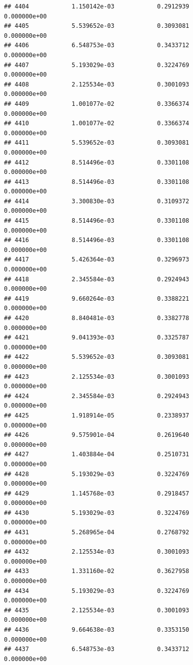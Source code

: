 \documentclass[
]{article}
\begin{document}
\begin{verbatim}
## 4404            1.150142e-03            0.2912939            0.000000e+00
## 4405            5.539652e-03            0.3093081            0.000000e+00
## 4406            6.548753e-03            0.3433712            0.000000e+00
## 4407            5.193029e-03            0.3224769            0.000000e+00
## 4408            2.125534e-03            0.3001093            0.000000e+00
## 4409            1.001077e-02            0.3366374            0.000000e+00
## 4410            1.001077e-02            0.3366374            0.000000e+00
## 4411            5.539652e-03            0.3093081            0.000000e+00
## 4412            8.514496e-03            0.3301108            0.000000e+00
## 4413            8.514496e-03            0.3301108            0.000000e+00
## 4414            3.300830e-03            0.3109372            0.000000e+00
## 4415            8.514496e-03            0.3301108            0.000000e+00
## 4416            8.514496e-03            0.3301108            0.000000e+00
## 4417            5.426364e-03            0.3296973            0.000000e+00
## 4418            2.345584e-03            0.2924943            0.000000e+00
## 4419            9.660264e-03            0.3388221            0.000000e+00
## 4420            8.840481e-03            0.3382778            0.000000e+00
## 4421            9.041393e-03            0.3325787            0.000000e+00
## 4422            5.539652e-03            0.3093081            0.000000e+00
## 4423            2.125534e-03            0.3001093            0.000000e+00
## 4424            2.345584e-03            0.2924943            0.000000e+00
## 4425            1.918914e-05            0.2338937            0.000000e+00
## 4426            9.575901e-04            0.2619640            0.000000e+00
## 4427            1.403884e-04            0.2510731            0.000000e+00
## 4428            5.193029e-03            0.3224769            0.000000e+00
## 4429            1.145768e-03            0.2918457            0.000000e+00
## 4430            5.193029e-03            0.3224769            0.000000e+00
## 4431            5.268965e-04            0.2768792            0.000000e+00
## 4432            2.125534e-03            0.3001093            0.000000e+00
## 4433            1.331160e-02            0.3627958            0.000000e+00
## 4434            5.193029e-03            0.3224769            0.000000e+00
## 4435            2.125534e-03            0.3001093            0.000000e+00
## 4436            9.664638e-03            0.3353150            0.000000e+00
## 4437            6.548753e-03            0.3433712            0.000000e+00

\end{verbatim}
\end{document}
